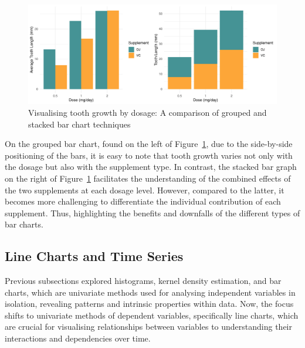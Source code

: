 \documentclass{article}\usepackage[]{graphicx}\usepackage[]{xcolor}
\makeatletter
\def\maxwidth{ %
  \ifdim\Gin@nat@width>\linewidth
    \linewidth
  \else
    \Gin@nat@width
  \fi
}
\newenvironment{knitrout}{}{} %
\numberwithin{equation}{section}
\makeatother
\begin{document}
\begin{knitrout}\scriptsize
{}\color{fgcolor}\begin{figure}[H]

{\centering \includegraphics[width=\maxwidth]{figure/beamer-barcharts-1} 

}

\caption[Visualising tooth growth by dosage]{Visualising tooth growth by dosage: A comparison of grouped and stacked bar chart techniques}\label{fig:barcharts}
\end{figure}

\end{knitrout}

\noindent On the grouped bar chart, found on the left of Figure~\ref{fig:barcharts}, due to the side-by-side positioning of the bars, it is easy to note that tooth growth varies not only with the dosage but also with the supplement type. In contrast, the stacked bar graph on the right of Figure~\ref{fig:barcharts} facilitates the understanding of the combined effects of the two supplements at each dosage level. However, compared to the latter, it becomes more challenging to differentiate the individual contribution of each supplement. Thus, highlighting the benefits and downfalls of the different types of bar charts.

\subsection{Line Charts and Time Series}

\noindent
Previous subsections explored histograms, kernel density estimation, and bar charts, which are univariate methods used for analysing independent variables in isolation, revealing patterns and intrinsic properties within data. Now, the focus shifts to univariate methods of dependent variables, specifically line charts, which are crucial for visualising relationships between variables to understanding their interactions and dependencies over time.
\end{document}
